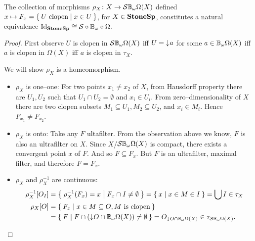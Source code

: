 \begin{proposition}
    The collection of morphisms $\rho_X\colon X \to \mathcal{S}\mathbb{B}_{\omega}\Omega(X)$ defined $x \mapsto F_x = \Set{U\text{ clopen} | x\in U }$, for $X \in \mathbf{StoneSp}$, constitutes a natural equivalence $\operatorname{Id}_{\mathbf{StoneSp}} \cong \mathcal{S}\circ\mathbb{B}_{\omega}\circ\Omega$.
\end{proposition}
\begin{proof}
    First observe $U$ is clopen in $\mathcal{S}\mathbb{B}_{\omega}\Omega(X)$ iff $U = \mathord{\downarrow}\mkern1mu a$ for some $a \in \mathbb{B}_{\omega}\Omega(X)$ iff $a$ is clopen in $\Omega(X)$ iff $a$ is clopen in $\tau_X$.

    We will show $\rho_X$ is a homeomorphism.
    \begin{itemize}
        \item $\rho_X$ is one--one: For two points $x_1 \neq x_2$ of $X$, from Hausdorff property there are $U_1, U_2$ such that $U_1\cap U_2 = \emptyset$ and $x_i\in U_i$. From zero--dimensionality of $X$ there are two clopen subsets $M_1 \subseteq U_1, M_2 \subseteq U_2$, and $x_i \in M_i$. Hence $F_{x_1} \neq F_{x_2}$.

        \item $\rho_X$ is onto: Take any $F$ ultafilter. From the observation above we know, $F$ is also an ultrafilter on $X$. Since $X$/$\mathcal{S}\mathbb{B}_{\omega}\Omega(X)$ is compact, there exists a convergent point $x$ of $F$. And so $F \subseteq F_x$. But $F$ is an ultrafilter, maximal filter, and therefore $F = F_x$.

        \item $\rho_X$ and $\rho_X^{-1}$ are continuous:
        \begin{align*}
            \rho_X^{-1}[O_I] &= \Set{ \rho_X^{-1}(F_x) = x | F_x \cap I \neq \emptyset} 
                = \Set{ x | x \in M \in I } = \bigcup I \in \tau_X \\
            \rho_X[O] &= \Set{ F_x | x \in M \subseteq O, M \text{ is clopen}} \\
                      &= \Set{ F | F \cap (\mathord{\downarrow}\mkern1muO \cap \ensuremath{\mathbb{B}_{\omega}}\Omega(X)) \neq \emptyset} = O_{\mathord{\downarrow}\mkern1mu O \cap \mathbb{B}_{\omega}\Omega(X)} \in \tau_{\mathcal{S}\mathbb{B}_{\omega}\Omega(X)}.
        \end{align*}
    \end{itemize}


\end{proof}
